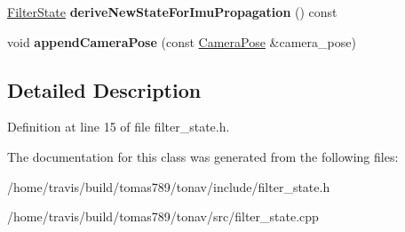 \begin{DoxyCompactItemize}
\item 
\hypertarget{class_filter_state_af33cfbc67284846e3ca9c26a79c227a9}{\hyperlink{class_filter_state}{Filter\-State} {\bfseries derive\-New\-State\-For\-Imu\-Propagation} () const }\label{class_filter_state_af33cfbc67284846e3ca9c26a79c227a9}

\item 
\hypertarget{class_filter_state_a9fdc71df11cf72369b86be2eaffcea27}{void {\bfseries append\-Camera\-Pose} (const \hyperlink{class_camera_pose}{Camera\-Pose} \&camera\-\_\-pose)}\label{class_filter_state_a9fdc71df11cf72369b86be2eaffcea27}

\end{DoxyCompactItemize}


\subsection{Detailed Description}


Definition at line 15 of file filter\-\_\-state.\-h.



The documentation for this class was generated from the following files\-:\begin{DoxyCompactItemize}
\item 
/home/travis/build/tomas789/tonav/include/filter\-\_\-state.\-h\item 
/home/travis/build/tomas789/tonav/src/filter\-\_\-state.\-cpp\end{DoxyCompactItemize}
